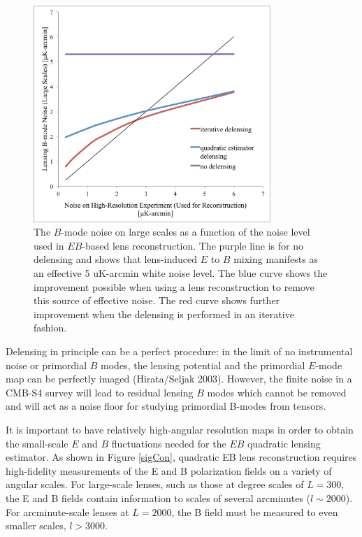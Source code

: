 \documentclass{tcibook}
\begin{document}
\begin{figure}[h]
\centering
\includegraphics[width=0.8\textwidth]{delensPlot.pdf}
\vspace{0.3cm}
\caption{The $B$-mode noise on large scales as a function of the noise level used in $EB$-based lens reconstruction.  The purple line is for no delensing and shows that lens-induced  $E$ to $B$ mixing manifests as an effective 5 uK-arcmin white noise level.  The blue curve shows the improvement possible when using a lens reconstruction to remove this source of effective noise.  The red curve shows further improvement when the delensing is performed in an iterative fashion.}
\label{iterative}
\end{figure}

Delensing in principle can be a perfect procedure: in the limit of no instrumental noise or primordial $B$ modes, the lensing potential and the primordial $E$-mode map can be perfectly imaged (Hirata/Seljak 2003).  However, the finite noise in a CMB-S4 survey will lead to residual lensing $B$ modes which cannot be removed and will act as a noise floor for studying primordial B-modes from tensors.  


It is important to have relatively high-angular resolution maps in order to obtain the small-scale $E$ and $B$ fluctuations needed for the $EB$ quadratic lensing estimator.  As shown in Figure \ref{sigCon}, quadratic EB lens reconstruction requires high-fidelity measurements of the E and B polarization fields on a variety of angular scales.  For large-scale lenses, such as those at degree scales of $L=300$, the E and B fields contain information to scales of several arcminutes ($l \sim 2000$).  For arcminute-scale lenses at $L = 2000$, the B field must be measured to even smaller scales, $l > 3000$. 
\end{document}
